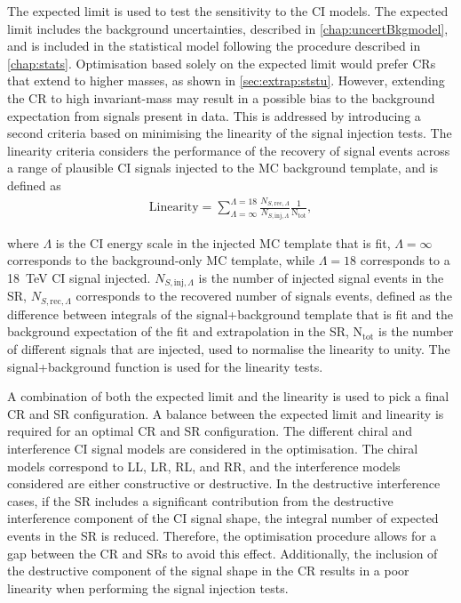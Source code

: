 The expected limit is used to test the sensitivity to the CI models. The expected limit includes the background uncertainties, described in \cref{chap:uncertBkgmodel}, and is included in the statistical model following the procedure described in \cref{chap:stats}. Optimisation based solely on the expected limit would prefer CRs that extend to higher masses, as shown in \cref{sec:extrap:ststu}. However, extending the CR to high invariant-mass may result in a possible bias to the background expectation from signals present in data. This is addressed by introducing a second criteria based on minimising the linearity of the signal injection tests. The linearity criteria considers the performance of the recovery of signal events across a range of plausible CI signals injected to the MC background template, and is defined as
\begin{equation}
    \label{eq:linearity}
    \begin{aligned}
        \mathrm{Linearity} = \sum^{\Lambda = 18}_{\Lambda = \infty} \frac{N_{S,\mathrm{rec},\Lambda}}{N_{S,\mathrm{inj},\Lambda}}  \frac{1}{\mathrm{N}_\mathrm{tot}},
    \end{aligned}
\end{equation}

where $\Lambda$ is the CI energy scale in the injected MC template that is fit, $\Lambda = \infty$ corresponds to the background-only MC template, while $\Lambda = 18$ corresponds to a \SI{18}{\tera\electronvolt} CI signal injected. $N_{S,\mathrm{inj},\Lambda}$ is the number of injected signal events in the SR, $N_{S,\mathrm{rec},\Lambda}$ corresponds to the recovered number of signals events, defined as the difference between integrals of the signal+background template that is fit and the background expectation of the fit and extrapolation in the SR, $\mathrm{N}_\mathrm{tot}$ is the number of different signals that are injected, used to normalise the linearity to unity. The signal+background function is used for the linearity tests. 

A combination of both the expected limit and the linearity is used to pick a final CR and SR configuration. A balance between the expected limit and linearity is required for an optimal CR and SR configuration. The different chiral and interference CI signal models are considered in the optimisation. The chiral models correspond to LL, LR, RL, and RR, and the interference models considered are either constructive or destructive. In the destructive interference cases, if the SR includes a significant contribution from the destructive interference component of the CI signal shape, the integral number of expected events in the SR is reduced. Therefore, the optimisation procedure allows for a gap between the CR and SRs to avoid this effect. Additionally, the inclusion of the destructive component of the signal shape in the CR results in a poor linearity when performing the signal injection tests. 


